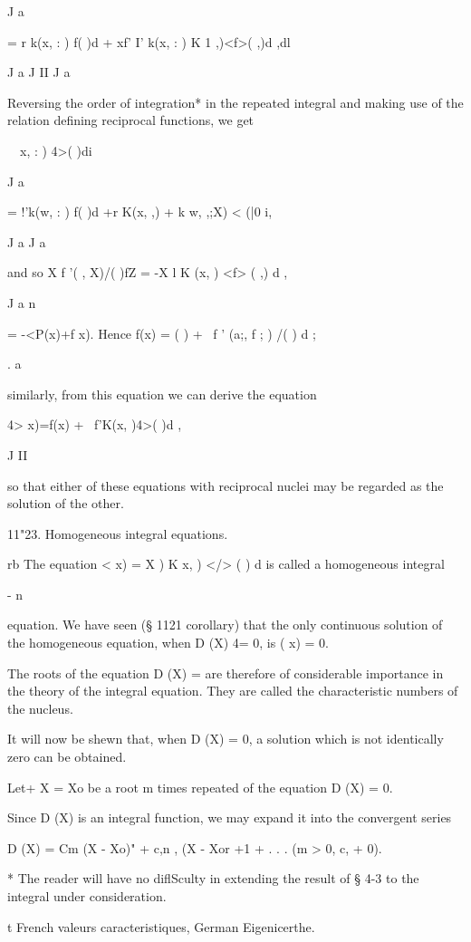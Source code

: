 J a 

= r k(x,  : ) f( )d  + xf' I' k(x,  : )  K 1  ,)<f>( ,)d ,dl 

J a J II J a 

Reversing the order of integration* in the repeated integral and making 
use of the relation defining reciprocal functions, we get 

\ \  x, : ) 4>( )di 

J a 

= !'k(w,  : ) f( )d +r K(x,  ,) + k w,  ,;X) < (|0 i, 

J a J a 

and so X f  '( ,  X)/( )fZ  = -X l  K (x,  ) <f> ( ,) d , 

J a   n 

= -<P(x)+f x). 
Hence f(x) = ( ) + \ f  ' (a;, f ;  ) /( ) d  ; 

. a 

similarly, from this equation we can derive the equation 

4> x)=f(x) + \ f'K(x, )4>( )d , 

J II 

so that either of these equations with reciprocal nuclei may be regarded as 
the solution of the other. 

11"23. Homogeneous integral equations. 

rb 
The equation <   x) = X ) K  x,  ) </> ( ) d  is called a homogeneous integral 

- n 

equation. We have seen (§ 1121 corollary) that the only continuous solution 
of the homogeneous equation, when D (X) 4= 0, is (   x) = 0. 

The roots of the equation D (X) = are therefore of considerable 
importance in the theory of the integral equation. They are called the 
characteristic numbers  of the nucleus. 

It will now be shewn that, when D (X) = 0, a solution which is not 
identically zero can be obtained. 

Let+ X = Xo be a root m times repeated of the equation D (X) = 0. 

Since D (X) is an integral function, we may expand it into the convergent 
series 

D (X) = Cm (X - Xo)"  + c,n , (X - Xor +1 + . . . (m > 0, c,  + 0). 

* The reader will have no diflSculty in extending the result of § 4-3 to the integral under 
consideration. 

t French valeurs caracteristiques, German Eigenicerthe. 

